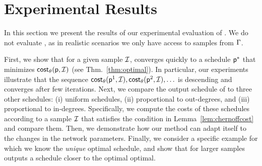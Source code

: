 \section{Experimental Results}\label{sec:exp}
In this section we present the results of our experimental evaluation of
\algonameapx. We do not evaluate \algoname, as in realistic scenarios we only
have access to samples from $\Gamma$.

 First, we show that for a given sample $\mathcal{I}$, \algonameapx
converges quickly to a schedule $\mathsf{p}^*$ that minimizes $\mathsf{cost}_\theta(\mathsf{p},
\mathcal{I})$ (see Thm.~\ref{thm:optimal}). In particular, our experiments
illustrate that the sequence $\mathsf{cost}_\theta(\mathsf{p}^1,\mathcal{I}), \mathsf{cost}_\theta(\mathsf{p}^2, \mathcal{I}),
\ldots$ is descending and converges after few iterations. Next, we compare the
output schedule of \algonameapx to three other schedules: (i) uniform schedules,
(ii) proportional to out-degrees, and (iii) proportional to in-degrees.
Specifically, we compute the costs of these schedules according to a sample
$\mathcal{I}$ that satisfies the condition in Lemma~\ref{lem:chernoffcost} and
compare them.
Then, we demonstrate how our method can adapt itself to the changes in the
network parameters. Finally, we consider a specific example for which we know
the \emph{unique} optimal schedule, and show that for larger samples
\algonameapx outputs a schedule closer to the optimal optimal.



